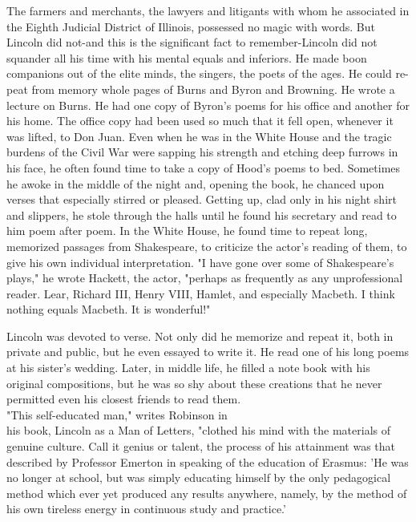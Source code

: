 \documentclass[10pt]{article}
\begin{document}
The farmers and merchants, the lawyers and litigants with whom he associated in the Eighth Judicial District of Illinois, possessed no magic with words. But Lincoln did not-and this is the significant fact to remember-Lincoln did not squander all his time with his mental equals and inferiors. He made boon companions out of the elite minds, the singers, the poets of the ages. He could re-\\
peat from memory whole pages of Burns and Byron and Browning. He wrote a lecture on Burns. He had one copy of Byron's poems for his office and another for his home. The office copy had been used so much that it fell open, whenever it was lifted, to Don Juan. Even when he was in the White House and the tragic burdens of the Civil War were sapping his strength and etching deep furrows in his face, he often found time to take a copy of Hood's poems to bed. Sometimes he awoke in the middle of the night and, opening the book, he chanced upon verses that especially stirred or pleased. Getting up, clad only in his night shirt and slippers, he stole through the halls until he found his secretary and read to him poem after poem. In the White House, he found time to repeat long, memorized passages from Shakespeare, to criticize the actor's reading of them, to give his own individual interpretation. "I have gone over some of Shakespeare's plays," he wrote Hackett, the actor, "perhaps as frequently as any unprofessional reader. Lear, Richard III, Henry VIII, Hamlet, and especially Macbeth. I think nothing equals Macbeth. It is wonderful!"

Lincoln was devoted to verse. Not only did he memorize and repeat it, both in private and public, but he even essayed to write it. He read one of his long poems at his sister's wedding. Later, in middle life, he filled a note book with his original compositions, but he was so shy about these creations that he never permitted even his closest friends to read them.\\
"This self-educated man," writes Robinson in\\
his book, Lincoln as a Man of Letters, "clothed his mind with the materials of genuine culture. Call it genius or talent, the process of his attainment was that described by Professor Emerton in speaking of the education of Erasmus: 'He was no longer at school, but was simply educating himself by the only pedagogical method which ever yet produced any results anywhere, namely, by the method of his own tireless energy in continuous study and practice.'
\end{document}

